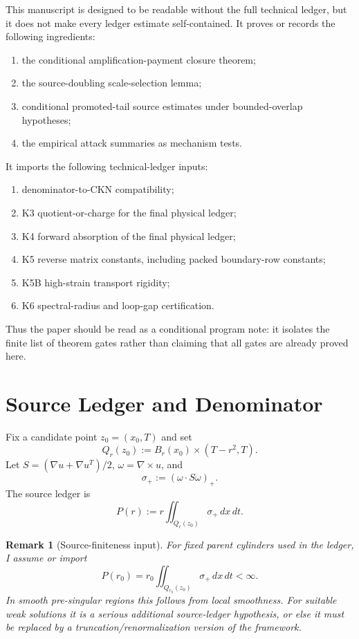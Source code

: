 \documentclass[11pt]{article}
\newtheorem{remark}{Remark}
\begin{document}
This manuscript is designed to be readable without the full technical ledger,
but it does not make every ledger estimate self-contained.  It proves or
records the following ingredients:
\begin{enumerate}
\item the conditional amplification-payment closure theorem;
\item the source-doubling scale-selection lemma;
\item conditional promoted-tail source estimates under bounded-overlap hypotheses;
\item the empirical attack summaries as mechanism tests.
\end{enumerate}
It imports the following technical-ledger inputs:
\begin{enumerate}
\item denominator-to-CKN compatibility;
\item K3 quotient-or-charge for the final physical ledger;
\item K4 forward absorption of the final physical ledger;
\item K5 reverse matrix constants, including packed boundary-row constants;
\item K5B high-strain transport rigidity;
\item K6 spectral-radius and loop-gap certification.
\end{enumerate}
Thus the paper should be read as a conditional program note: it isolates the
finite list of theorem gates rather than claiming that all gates are already
proved here.

\clearpage
\section{Source Ledger and Denominator}
\label{sec:denominator}

Fix a candidate point \(z_0=(x_0,T)\) and set
\[
Q_r(z_0):=B_r(x_0)\times(T-r^2,T).
\]
Let \(S=(\nabla u+\nabla u^T)/2\), \(\omega=\nabla\times u\), and
\[
\sigma_+:=(\omega\cdot S\omega)_+.
\]
The source ledger is
\begin{equation}
\label{eq:P-def}
P(r):=r\iint_{Q_r(z_0)}\sigma_+\,dx\,dt.
\end{equation}

\begin{remark}[Source-finiteness input]
\label{rem:source-finiteness}
For fixed parent cylinders used in the ledger, I assume or import
\[
P(r_0)=r_0\iint_{Q_{r_0}(z_0)}\sigma_+\,dx\,dt<\infty.
\]
In smooth pre-singular regions this follows from local smoothness.  For
suitable weak solutions it is a serious additional source-ledger hypothesis,
or else it must be replaced by a truncation/renormalization version of the
framework.
\end{remark}
\end{document}
